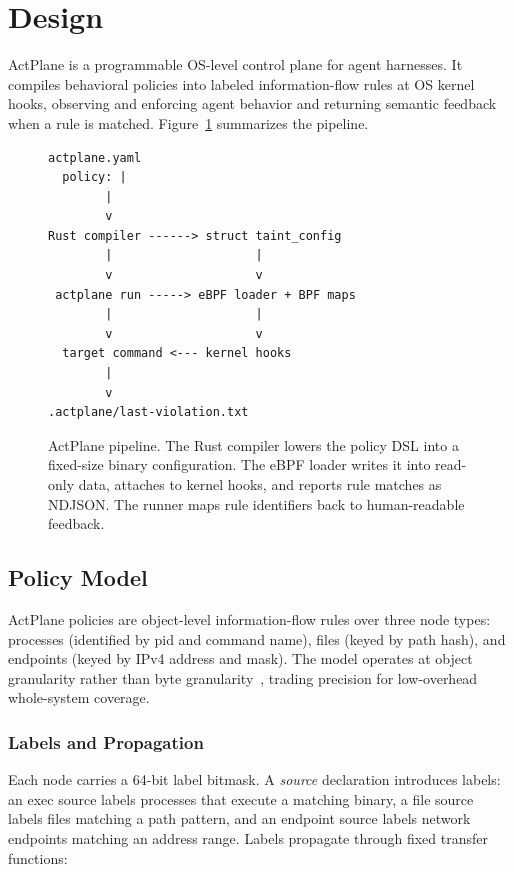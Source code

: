 \section{Design}
\label{sec:design}

ActPlane is a programmable OS-level control plane for agent harnesses. It
compiles behavioral policies into labeled information-flow rules at OS
kernel hooks, observing and enforcing agent behavior and returning semantic
feedback when a rule is matched. Figure~\ref{fig:architecture} summarizes
the pipeline.

\begin{figure}[t]
\begin{verbatim}
actplane.yaml
  policy: |
        |
        v
Rust compiler ------> struct taint_config
        |                    |
        v                    v
 actplane run -----> eBPF loader + BPF maps
        |                    |
        v                    v
  target command <--- kernel hooks
        |
        v
.actplane/last-violation.txt
\end{verbatim}
\caption{ActPlane pipeline. The Rust compiler lowers the policy DSL into a
fixed-size binary configuration. The eBPF loader writes it into read-only
data, attaches to kernel hooks, and reports rule matches as NDJSON. The runner
maps rule identifiers back to human-readable feedback.}
\label{fig:architecture}
\end{figure}

\subsection{Policy Model}

ActPlane policies are object-level information-flow rules over three node
types: processes (identified by pid and command name), files (keyed by
path hash), and endpoints (keyed by IPv4 address and mask). The model
operates at object granularity rather than byte
granularity~\cite{kemerlis2012libdft}, trading precision for low-overhead
whole-system coverage.

\subsubsection{Labels and Propagation}

Each node carries a 64-bit label bitmask. A \emph{source} declaration
introduces labels: an exec source labels processes that execute a matching
binary, a file source labels files matching a path pattern, and an endpoint
source labels network endpoints matching an address range. Labels propagate
through fixed transfer functions:

